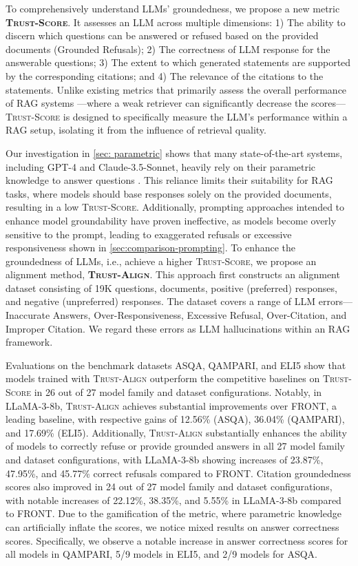 \documentclass{article} %
\renewcommand{\cite}[1]{\citep{#1}}
\newcommand{\method}[0]{\textsc{Trust-Align}}
\newcommand{\metric}[0]{\textsc{Trust-Score}}
\begin{document}
To comprehensively understand LLMs' groundedness, we propose a new metric \textbf{\metric{}}. It assesses an LLM across multiple dimensions: 1) The ability to discern which questions can be answered or refused based on the provided documents (Grounded Refusals); 2) The correctness of LLM response for the answerable questions; 3) The extent to which generated statements are supported by the corresponding citations; and 4) The relevance of the citations to the statements. Unlike existing metrics that primarily assess the overall performance of RAG systems \cite{gao2023enabling}—where a weak retriever can significantly decrease the scores—\metric{} is designed to specifically measure the LLM's performance within a RAG setup, isolating it from the influence of retrieval quality.

Our investigation in \cref{sec: parametric} shows that many state-of-the-art systems, including GPT-4 and Claude-3.5-Sonnet, heavily rely on their parametric knowledge to answer questions \citep{openai2023chatgpt, anthropic2024claude}. This reliance limits their suitability for RAG tasks, where models should base responses solely on the provided documents, resulting in a low \metric{}. Additionally, prompting approaches intended to enhance model groundability have proven ineffective, as models become overly sensitive to the prompt, leading to exaggerated refusals or excessive responsiveness shown in \cref{sec:comparison-prompting}. To enhance the groundedness of LLMs, i.e., achieve a higher \metric{}, we propose an alignment method, \textbf{\method{}}. This approach first constructs an alignment dataset consisting of 19K questions, documents, positive (preferred) responses, and negative (unpreferred) responses. The dataset covers a range of LLM errors—Inaccurate Answers, Over-Responsiveness, Excessive Refusal, Over-Citation, and Improper Citation. We regard these errors as LLM hallucinations within an RAG framework.

Evaluations on the benchmark datasets ASQA, QAMPARI, and ELI5 show that models trained with \method{} outperform the competitive baselines on \metric{} in 26 out of 27 model family and dataset configurations. Notably, in LLaMA-3-8b, \method{} achieves substantial improvements over \citet{huang-etal-2024-learning} FRONT, a leading baseline, with respective gains of 12.56\% (ASQA), 36.04\% (QAMPARI), and 17.69\% (ELI5). Additionally, \method{} substantially enhances the ability of models to correctly refuse or provide grounded answers in all 27 model family and dataset configurations, with LLaMA-3-8b showing increases of 23.87\%, 47.95\%, and 45.77\% correct refusals compared to FRONT. Citation groundedness scores also improved in 24 out of 27 model family and dataset configurations, with notable increases of 22.12\%, 38.35\%, and 5.55\% in LLaMA-3-8b compared to FRONT. Due to the gamification of the metric, where parametric knowledge can artificially inflate the scores, we notice mixed results on answer correctness scores. Specifically, we observe a notable increase in answer correctness scores for all models in QAMPARI, 5/9 models in ELI5, and 2/9 models for ASQA. 
\end{document}
